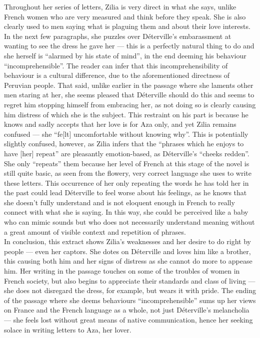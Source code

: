 \documentclass[12pt,a4paper]{article}
\begin{document}
Throughout her series of letters, Zilia is very direct in what she says, unlike French women who are very measured and think before they speak. She is also clearly used to men saying what is plaguing them and about their love interests. In the next few paragraphs, she puzzles over Déterville's embarassment at wanting to see the dress he gave her --- this is a perfectly natural thing to do and she herself is ``alarmed by his state of mind'', in the end deeming his behaviour ``incomprehensible''. The reader can infer that this incomprehensibility of behaviour is a cultural difference, due to the aforementioned directness of Peruvian people. That said, unlike earlier in the passage where she laments other men staring at her, she seems pleased that Déterville should do this and seems to regret him stopping himself from embracing her, as not doing so is clearly causing him distress of which she is the subject. This restraint on his part is because he knows and sadly accepts that her love is for Aza only, and yet Zilia remains confused --- she ``fe[lt] uncomfortable without knowing why''. This is potentially slightly confused, however, as Zilia infers that the ``phrases which he enjoys to have [her] repeat'' are pleasantly emotion-based, as Déterville's ``cheeks redden''. She only ``repeats'' them because her level of French at this stage of the novel is still quite basic, as seen from the flowery, very correct language she uses to write these letters. This occurrence of her only repeating the words he has told her in the past could lead Déterville to feel worse about his feelings, as he knows that she doesn't fully understand and is not eloquent enough in French to really connect with what she is saying. In this way, she could be perceived like a baby who can mimic sounds but who does not necessarily understand meaning without a great amount of visible context and repetition of phrases.\\

In conclusion, this extract shows Zilia's weaknesses and her desire to do right by people --- even her captors. She dotes on Déterville and loves him like a brother, this causing both him and her signs of distress as she cannot do more to appease him. Her writing in the passage touches on some of the troubles of women in French society, but also begins to appreciate their standards and class of living --- she does not disregard the dress, for example, but wears it with pride. The ending of the passage where she deems behaviours ``incomprehensible'' sums up her views on France and the French language as a whole, not just Déterville's melancholia --- she feels lost without great means of native communication, hence her seeking solace in writing letters to Aza, her lover.
\end{document}
